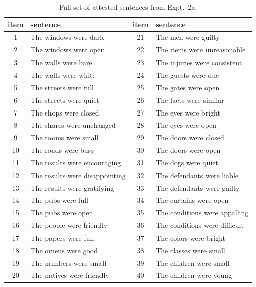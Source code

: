 \documentclass[preprint,12pt,authoryear,titlepage]{elsarticle}
\begin{document}
\begin{table}[htb]
	\renewcommand\thetable{E.1}
	\centering \caption{Full set of attested sentences from Expt.~2a.} 
	\label{expt2amaterials}
\begin{tabular}{cl|cl}\toprule
item	& 	sentence		& item & sentence		\\ \midrule						
1	&	The	windows	were	dark	&	21	&	The	men	were	guilty	\\
2	&	The	windows	were	open	&	22	&	The	items	were	unreasonable	\\
3	&	The	walls	were	bare	&	23	&	The	injuries	were	consistent	\\
4	&	The	walls	were	white	&	24	&	The	guests	were	due	\\
5	&	The	streets	were	full	&	25	&	The	gates	were	open	\\
6	&	The	streets	were	quiet	&	26	&	The	facts	were	similar	\\
7	&	The	shops	were	closed	&	27	&	The	eyes	were	bright	\\
8	&	The	shares	were	unchanged	&	28	&	The	eyes	were	open	\\
9	&	The	rooms	were	small	&	29	&	The	doors	were	closed	\\
10	&	The	roads	were	busy	&	30	&	The	doors	were	open	\\
11	&	The	results	were	encouraging	&	31	&	The	dogs	were	quiet	\\
12	&	The	results	were	disappointing	&	32	&	The	defendants	were	liable	\\
13	&	The	results	were	gratifying	&	33	&	The	defendants	were	guilty	\\
14	&	The	pubs	were	full	&	34	&	The	curtains	were	open	\\
15	&	The	pubs	were	open	&	35	&	The	conditions	were	appalling	\\
16	&	The	people	were	friendly	&	36	&	The	conditions	were	difficult	\\
17	&	The	papers	were	full	&	37	&	The	colors	were	bright	\\
18	&	The	omens	were	good	&	38	&	The	classes	were	small	\\
19	&	The	numbers	were	small	&	39	&	The	children	were	small	\\
20	&	The	natives	were	friendly	&	40	&	The	children	were	young	\\ \bottomrule
\end{tabular}
\end{table}
\end{document}
